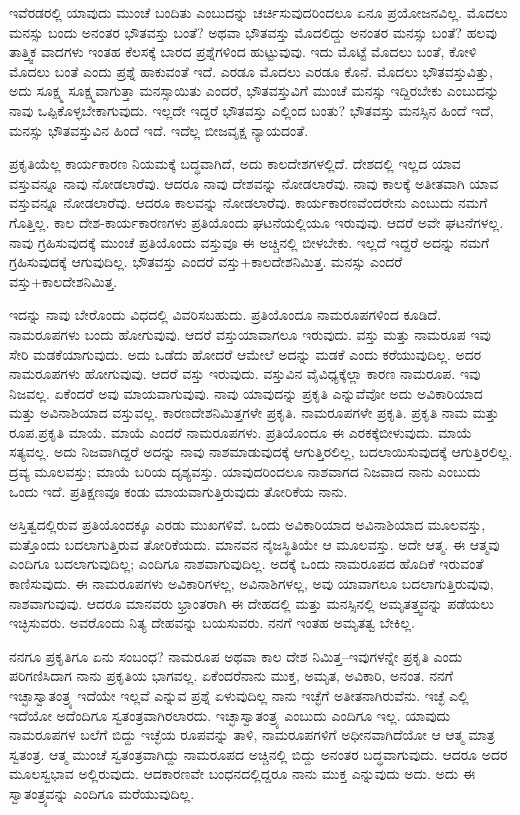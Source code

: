 ಇವೆರಡರಲ್ಲಿ ಯಾವುದು ಮುಂಚೆ ಬಂದಿತು ಎಂಬುದನ್ನು ಚರ್ಚಿಸುವುದರಿಂದಲೂ ಏನೂ ಪ್ರಯೋಜನವಿಲ್ಲ. ಮೊದಲು ಮನಸ್ಸು ಬಂದು ಅನಂತರ ಭೌತವಸ್ತು ಬಂತೆ? ಅಥವಾ ಭೌತವಸ್ತು ಮೊದಲಿದ್ದು ಅನಂತರ ಮನಸ್ಸು ಬಂತೆ? ಹಲವು ತಾತ್ತ್ವಿಕ ವಾದಗಳು ಇಂತಹ ಕೆಲಸಕ್ಕೆ ಬಾರದ ಪ್ರಶ್ನೆಗಳಿಂದ ಹುಟ್ಟುವುವು. ಇದು ಮೊಟ್ಟೆ ಮೊದಲು ಬಂತೆ, ಕೋಳಿ ಮೊದಲು ಬಂತೆ ಎಂದು ಪ್ರಶ್ನೆ ಹಾಕುವಂತೆ ಇದೆ. ಎರಡೂ ಮೊದಲು ಎರಡೂ ಕೊನೆ. ಮೊದಲು ಭೌತವಸ್ತುವಿತ್ತು, ಅದು ಸೂಕ್ಷ್ಮ ಸೂಕ್ಷ್ಮವಾಗುತ್ತಾ ಮನಸ್ಸಾಯಿತು ಎಂದರೆ, ಭೌತವಸ್ತುವಿಗೆ ಮುಂಚೆ ಮನಸ್ಸು ಇದ್ದಿರಬೇಕು ಎಂಬುದನ್ನು ನಾವು ಒಪ್ಪಿಕೊಳ್ಳಬೇಕಾಗುವುದು. ಇಲ್ಲದೇ ಇದ್ದರೆ ಭೌತವಸ್ತು ಎಲ್ಲಿಂದ ಬಂತು? ಭೌತವಸ್ತು ಮನಸ್ಸಿನ ಹಿಂದೆ ಇದೆ, ಮನಸ್ಸು ಭೌತವಸ್ತುವಿನ ಹಿಂದೆ ಇದೆ. ಇದೆಲ್ಲ ಬೀಜವೃಕ್ಷ ನ್ಯಾಯದಂತೆ.

ಪ್ರಕೃತಿಯೆಲ್ಲ ಕಾರ್ಯಕಾರಣ ನಿಯಮಕ್ಕೆ ಬದ್ಧವಾಗಿದೆ, ಅದು ಕಾಲದೇಶಗಳಲ್ಲಿದೆ. ದೇಶದಲ್ಲಿ ಇಲ್ಲದ ಯಾವ ವಸ್ತುವನ್ನೂ ನಾವು ನೋಡಲಾರೆವು. ಆದರೂ ನಾವು ದೇಶವನ್ನು ನೋಡಲಾರೆವು. ನಾವು ಕಾಲಕ್ಕೆ ಅತೀತವಾಗಿ ಯಾವ ವಸ್ತುವನ್ನೂ ನೋಡಲಾರೆವು. ಆದರೂ ಕಾಲವನ್ನು ನೋಡಲಾರೆವು. ಕಾರ್ಯಕಾರಣವೆಂದರೇನು ಎಂಬುದು ನಮಗೆ ಗೊತ್ತಿಲ್ಲ. ಕಾಲ ದೇಶ-ಕಾರ್ಯಕಾರಣಗಳು ಪ್ರತಿಯೊಂದು ಘಟನೆಯಲ್ಲಿಯೂ ಇರುವುವು. ಆದರೆ ಅವೇ ಘಟನೆಗಳಲ್ಲ. ನಾವು ಗ್ರಹಿಸುವುದಕ್ಕೆ ಮುಂಚೆ ಪ್ರತಿಯೊಂದು ವಸ್ತುವೂ ಈ ಅಚ್ಚಿನಲ್ಲಿ ಬೀಳಬೇಕು. ಇಲ್ಲದೆ ಇದ್ದರೆ ಅದನ್ನು ನಮಗೆ ಗ್ರಹಿಸುವುದಕ್ಕೆ ಆಗುವುದಿಲ್ಲ. ಭೌತವಸ್ತು ಎಂದರೆ ವಸ್ತು+ಕಾಲದೇಶನಿಮಿತ್ತ. ಮನಸ್ಸು ಎಂದರೆ ವಸ್ತು+ಕಾಲದೇಶನಿಮಿತ್ತ.

ಇದನ್ನು ನಾವು ಬೇರೊಂದು ವಿಧದಲ್ಲಿ ವಿವರಿಸಬಹುದು. ಪ್ರತಿಯೊಂದೂ ನಾಮರೂಪಗಳಿಂದ ಕೂಡಿದೆ. ನಾಮರೂಪಗಳು ಬಂದು ಹೋಗುವುವು. ಆದರೆ ವಸ್ತು\break ಯಾವಾಗಲೂ ಇರುವುದು. ವಸ್ತು ಮತ್ತು ನಾಮರೂಪ ಇವು ಸೇರಿ ಮಡಕೆಯಾಗುವುದು. ಅದು ಒಡೆದು ಹೋದರೆ ಆಮೇಲೆ ಅದನ್ನು ಮಡಕೆ ಎಂದು ಕರೆಯುವುದಿಲ್ಲ. ಅದರ ನಾಮರೂಪಗಳು ಹೋಗುವುವು. ಆದರೆ ವಸ್ತು ಇರುವುದು. ವಸ್ತುವಿನ ವೈವಿಧ್ಯಕ್ಕೆಲ್ಲಾ ಕಾರಣ ನಾಮರೂಪ. ಇವು ನಿಜವಲ್ಲ. ಏಕೆಂದರೆ ಅವು ಮಾಯವಾಗುವುವು. ನಾವು ಯಾವುದನ್ನು ಪ್ರಕೃತಿ ಎನ್ನುವೆವೋ ಅದು ಅವಿಕಾರಿಯಾದ ಮತ್ತು ಅವಿನಾಶಿಯಾದ ವಸ್ತುವಲ್ಲ. ಕಾರಣದೇಶನಿಮಿತ್ತಗಳೇ ಪ್ರಕೃತಿ. ನಾಮರೂಪಗಳೇ ಪ್ರಕೃತಿ. ಪ್ರಕೃತಿ ನಾಮ ಮತ್ತು ರೂಪ.\break ಪ್ರಕೃತಿ ಮಾಯೆ. ಮಾಯೆ ಎಂದರೆ ನಾಮರೂಪಗಳು. ಪ್ರತಿಯೊಂದೂ ಈ ಎರಕಕ್ಕೆ\break ಬೀಳುವುದು. ಮಾಯೆ ಸತ್ಯವಲ್ಲ. ಅದು ನಿಜವಾಗಿದ್ದರೆ ಅದನ್ನು ನಾವು ನಾಶಮಾಡುವುದಕ್ಕೆ ಆಗುತ್ತಿರಲಿಲ್ಲ, ಬದಲಾಯಿಸುವುದಕ್ಕೆ ಆಗುತ್ತಿರಲಿಲ್ಲ. ದ್ರವ್ಯ ಮೂಲವಸ್ತು; ಮಾಯೆ ಬರಿಯ ದೃಶ್ಯವಸ್ತು. ಯಾವುದರಿಂದಲೂ ನಾಶವಾಗದ ನಿಜವಾದ ನಾನು ಎಂಬುದು ಒಂದು ಇದೆ. ಪ್ರತಿಕ್ಷಣವೂ ಕಂಡು ಮಾಯವಾಗುತ್ತಿರುವುದು ತೋರಿಕೆಯ ನಾನು.

ಅಸ್ತಿತ್ವದಲ್ಲಿರುವ ಪ್ರತಿಯೊಂದಕ್ಕೂ ಎರಡು ಮುಖಗಳಿವೆ. ಒಂದು ಅವಿಕಾರಿಯಾದ ಅವಿನಾಶಿಯಾದ ಮೂಲವಸ್ತು, ಮತ್ತೊಂದು ಬದಲಾಗುತ್ತಿರುವ ತೋರಿಕೆಯದು. ಮಾನ\-ವನ ನೈಜಸ್ಥಿತಿಯೇ ಆ ಮೂಲವಸ್ತು. ಅದೇ ಆತ್ಮ. ಈ ಆತ್ಮವು ಎಂದಿಗೂ ಬದಲಾಗುವುದಿಲ್ಲ; ಎಂದಿಗೂ ನಾಶವಾಗುವುದಿಲ್ಲ. ಅದಕ್ಕೆ ಒಂದು ನಾಮರೂಪದ ಹೊದಿಕೆ ಇರುವಂತೆ ಕಾಣಿಸುವುದು. ಈ ನಾಮರೂಪಗಳು ಅವಿಕಾರಿಗಳಲ್ಲ, ಅವಿನಾಶಿಗಳಲ್ಲ, ಅವು ಯಾವಾಗಲೂ ಬದಲಾಗುತ್ತಿರುವುವು, ನಾಶವಾಗುವುವು. ಆದರೂ ಮಾನವರು ಭ್ರಾಂತರಾಗಿ ಈ ದೇಹದಲ್ಲಿ ಮತ್ತು ಮನಸ್ಸಿನಲ್ಲಿ ಅಮೃತತ್ತ್ವವನ್ನು ಪಡೆಯಲು ಇಚ್ಛಿಸುವರು. ಅವರೊಂದು ನಿತ್ಯ ದೇಹವನ್ನು ಬಯಸುವರು. ನನಗೆ ಇಂತಹ ಅಮೃತತ್ವ ಬೇಕಿಲ್ಲ.

ನನಗೂ ಪ್ರಕೃತಿಗೂ ಏನು ಸಂಬಂಧ? ನಾಮರೂಪ ಅಥವಾ ಕಾಲ ದೇಶ ನಿಮಿತ್ತ–ಇವುಗಳನ್ನೇ ಪ್ರಕೃತಿ ಎಂದು ಪರಿಗಣಿಸಿದಾಗ ನಾನು ಪ್ರಕೃತಿಯ ಭಾಗವಲ್ಲ. ಏಕೆಂದರೆ\break ನಾನು ಮುಕ್ತ, ಅಮೃತ, ಅವಿಕಾರಿ, ಅನಂತ. ನನಗೆ ಇಚ್ಛಾಸ್ವಾತಂತ್ರ್ಯ ಇದೆಯೇ ಇಲ್ಲವೆ ಎನ್ನುವ ಪ್ರಶ್ನೆ ಏಳುವುದಿಲ್ಲ ನಾನು ಇಚ್ಛೆಗೆ ಅತೀತನಾಗಿರುವೆನು. ಇಚ್ಛೆ ಎಲ್ಲಿ ಇದೆಯೋ ಅದೆಂದಿಗೂ ಸ್ವತಂತ್ರವಾಗಿರಲಾರದು. ಇಚ್ಛಾಸ್ವಾತಂತ್ರ್ಯ ಎಂಬುದು ಎಂದಿಗೂ ಇಲ್ಲ. ಯಾವುದು ನಾಮರೂಪಗಳ ಬಲೆಗೆ ಬಿದ್ದು ಇಚ್ಛೆಯ ರೂಪವನ್ನು ತಾಳಿ, ನಾಮರೂಪಗಳಿಗೆ ಅಧೀನವಾಗಿದೆಯೋ ಆ ಆತ್ಮ ಮಾತ್ರ ಸ್ವತಂತ್ರ. ಆತ್ಮ ಮುಂಚೆ ಸ್ವತಂತ್ರವಾಗಿದ್ದು ನಾಮರೂಪದ ಅಚ್ಚಿನಲ್ಲಿ ಬಿದ್ದು ಅನಂತರ ಬದ್ಧವಾಗುವುದು. ಆದರೂ ಅದರ ಮೂಲಸ್ವಭಾವ ಅಲ್ಲಿರುವುದು. ಆದಕಾರಣವೇ ಬಂಧನದಲ್ಲಿದ್ದರೂ ನಾನು ಮುಕ್ತ ಎನ್ನುವುದು ಅದು. ಅದು ಈ ಸ್ವಾತಂತ್ರ್ಯವನ್ನು ಎಂದಿಗೂ ಮರೆಯುವುದಿಲ್ಲ.

